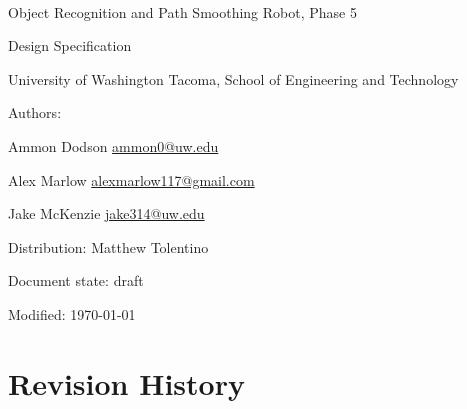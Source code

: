 \documentclass[english,12pt]{article}
\begin{document}
\begin{center}

\thispagestyle{empty}

$ $

\vspace{250pt}

\begin{bfseries}

{\Large Object Recognition and Path Smoothing Robot, Phase 5}

{\Huge Design Specification}


\end{bfseries}

\vspace{180pt}

University of Washington Tacoma, School of Engineering and Technology


\vspace{12pt}

Authors: 

Ammon Dodson \href{mailto:ammon0@uw.edu}{ammon0@uw.edu} 

Alex Marlow \href{mailto:alexmarlow117@gmail.com}{alexmarlow117@gmail.com} 

Jake McKenzie \href{mailto:jake314@uw.edu}{jake314@uw.edu}

Distribution: Matthew Tolentino

Document state: draft

Modified: \today

\end{center}

\newpage


\tableofcontents

\newpage


\section{Revision History}
\end{document}
